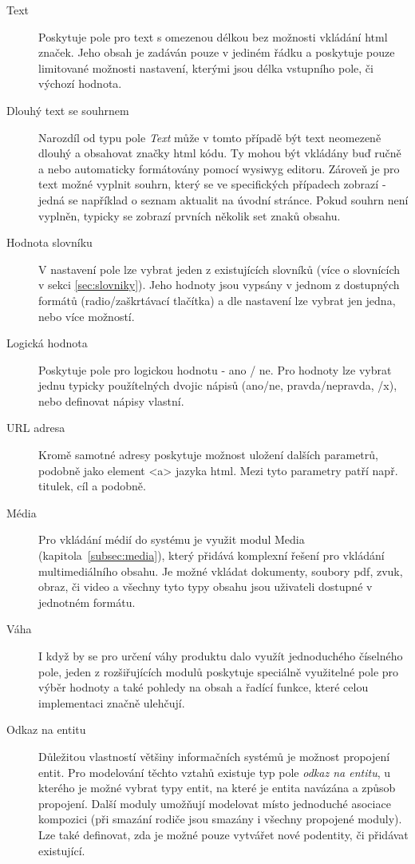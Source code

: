 \begin{description}
  \item[Text] Poskytuje pole pro text s omezenou délkou bez možnosti vkládání html značek. Jeho obsah je zadáván pouze v jediném řádku a poskytuje pouze limitované možnosti nastavení, kterými jsou délka vstupního pole, či výchozí hodnota. 
  
  \item[Dlouhý text se souhrnem] Narozdíl od typu pole \emph{Text} může v tomto případě být text neomezeně dlouhý a obsahovat značky html kódu. Ty mohou být vkládány buď ručně a nebo automaticky formátovány pomocí \gls{wysiwyg} editoru. Zároveň je pro text možné vyplnit souhrn, který se ve specifických případech zobrazí - jedná se například o seznam aktualit na úvodní stránce. Pokud souhrn není vyplněn, typicky se zobrazí prvních několik set znaků obsahu.
  
  \item[Hodnota slovníku] V nastavení pole lze vybrat jeden z existujících slovníků (více o slovnících v sekci \ref{sec:slovniky}). Jeho hodnoty jsou vypsány v jednom z dostupných formátů (radio/zaškrtávací tlačítka) a dle nastavení lze vybrat jen jedna, nebo více možností.
  
  \item[Logická hodnota] Poskytuje pole pro logickou hodnotu - ano / ne. Pro hodnoty lze vybrat jednu typicky použítelných dvojic nápisů (ano/ne, pravda/nepravda, \checkmark/x), nebo definovat nápisy vlastní. 

  \item[URL adresa] Kromě samotné adresy poskytuje možnost uložení dalších parametrů, podobně jako element <a> jazyka html. Mezi tyto parametry patří např. titulek, cíl a podobně.

  \item[Média] Pro vkládání médií do systému je využit modul Media (kapitola~\ref{subsec:media}), který přidává komplexní řešení pro vkládání multimediálního obsahu. Je možné vkládat dokumenty, soubory pdf, zvuk, obraz, či video a všechny tyto typy obsahu jsou uživateli dostupné v jednotném formátu.
  
  \item[Váha] I když by se pro určení váhy produktu dalo využít jednoduchého číselného pole, jeden z rozšiřujících modulů poskytuje speciálně využitelné pole pro výběr hodnoty a také pohledy na obsah a řadící funkce, které celou implementaci značně ulehčují.
  
  \item[Odkaz na entitu] Důležitou vlastností většiny informačních systémů je možnost propojení entit. Pro modelování těchto vztahů existuje typ pole \emph{odkaz na entitu}, u kterého je možné vybrat typy entit, na které je entita navázána a způsob propojení. Další moduly umožňují modelovat místo jednoduché asociace kompozici (při smazání rodiče jsou smazány i všechny propojené moduly). Lze také definovat, zda je možné pouze vytvářet nové podentity, či přidávat existující.
\end{description}
